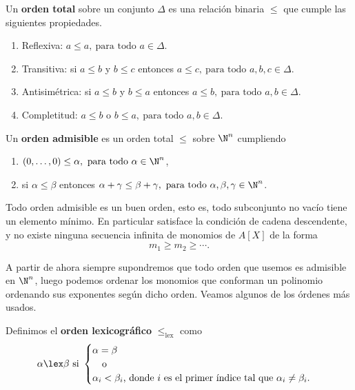 \begin{definicion}
    Un \textbf{orden total} sobre un conjunto $\Delta$ es una relación binaria $\le$ que cumple las siguientes propiedades.
    \begin{enumerate}
        \item Reflexiva: $a\le a,\ \text{para todo } a\in \Delta$.
        \item Transitiva: si $a\le b$ y $b\le c$ entonces $a\le c,\ \text{para todo } a,b,c\in \Delta$.
        \item Antisimétrica: si $a\le b$ y $b\le a$ entonces $a\le b,\ \text{para todo } a,b\in \Delta$.
        \item Completitud: $a\le b$ o $b\le a,\ \text{para todo } a,b\in \Delta$.
    \end{enumerate}
\end{definicion}
\begin{definicion}
    Un \textbf{orden admisible} es un orden total $\le$ sobre $\N^n$ cumpliendo
    \begin{enumerate}
        \item $(0,\dots ,0) \le \alpha,\ \text{para todo } \alpha \in \N^n$,
        \item si $\alpha \le \beta$ entonces $\alpha + \gamma \le \beta + \gamma,\ \text{para todo } \alpha,\beta,\gamma \in \N^n$.
    \end{enumerate}
\end{definicion}
\begin{proposicion}\label{l:descendente}
    Todo orden admisible es un buen orden, esto es, todo subconjunto no vacío tiene un elemento mínimo. En particular satisface la condición de cadena descendente, y no existe ninguna secuencia infinita de monomios de $A[X]$ de la forma
    \begin{equation*}
        m_1 \ge m_2 \ge \cdots.
    \end{equation*}
\end{proposicion}

A partir de ahora siempre supondremos que todo orden que usemos es admisible en $\N^n$, luego podemos ordenar los monomios que conforman un polinomio ordenando sus exponentes según dicho orden. Veamos algunos de los órdenes más usados. 

\begin{definicion}
    Definimos el \textbf{orden lexicográfico} $\le_{\text{lex}}$ como
    \begin{equation*}
        \alpha \lex \beta \text{ si } \begin{cases}
            \alpha  = \beta \\
            \quad\text{o}   \\
            \alpha_i < \beta_i \text{, donde $i$ es el primer índice tal que } \alpha_i \neq \beta_i.
        \end{cases}
    \end{equation*}
\end{definicion}


